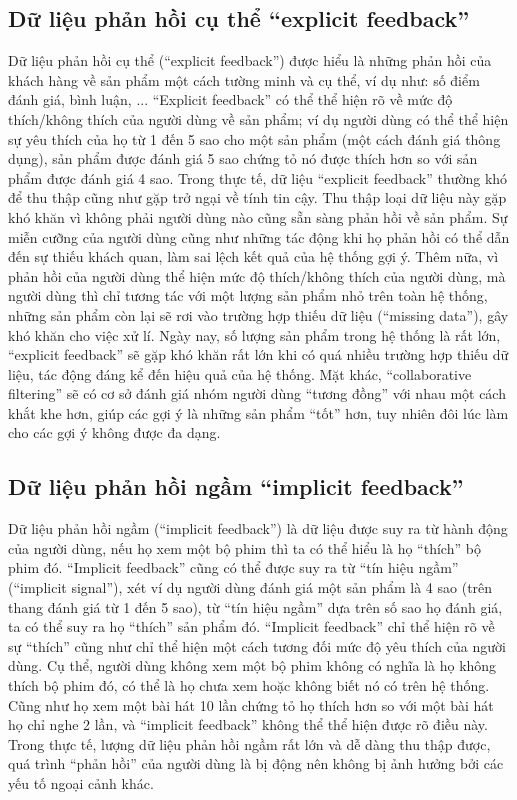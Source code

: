    \subsection{Dữ liệu phản hồi cụ thể ``explicit feedback''}
    Dữ liệu phản hồi cụ thể (``explicit feedback'') được hiểu là những
    phản hồi của khách hàng về sản phẩm một cách tường minh và cụ thể, ví dụ như: số điểm đánh giá,
    bình luận, ... ``Explicit feedback'' có thể thể hiện rõ về mức độ thích/không thích của người dùng về sản phẩm;
    ví dụ người dùng có thể thể hiện sự yêu thích của họ từ 1 đến 5 sao cho một sản phẩm (một cách đánh giá thông dụng), 
    sản phẩm được đánh giá 5 sao chứng tỏ nó được thích hơn so với sản phẩm được đánh giá 4 sao. 
    Trong thực tế, dữ liệu ``explicit feedback'' thường khó để thu thập cũng như gặp trở ngại về tính tin cậy.
    Thu thập loại dữ liệu này gặp khó khăn vì không phải người dùng nào cũng sẵn sàng phản hồi về sản phẩm. 
    Sự miễn cưỡng của người dùng cũng như những tác động khi họ phản hồi có thể dẫn đến sự thiếu khách quan,
    làm sai lệch kết quả của hệ thống gợi ý. 
    Thêm nữa, vì phản hồi của người dùng thể hiện mức độ thích/không thích của người dùng, mà người dùng thì chỉ tương tác với
    một lượng sản phẩm nhỏ trên toàn hệ thống, những sản phẩm còn lại sẽ rơi vào trường hợp thiếu dữ liệu (``missing data''),
    gây khó khăn cho việc xử lí. 
    Ngày nay, số lượng sản phẩm trong hệ thống là rất lớn, ``explicit feedback'' sẽ gặp khó khăn rất lớn khi có quá nhiều trường hợp thiếu dữ liệu,
    tác động đáng kể đến hiệu quả của hệ thống. Mặt khác, ``collaborative filtering'' sẽ có cơ sở đánh giá nhóm người dùng ``tương đồng'' với nhau
    một cách khắt khe hơn, giúp các gợi ý là những sản phẩm ``tốt'' hơn, tuy nhiên đôi lúc làm cho các gợi ý không được đa dạng.

    \subsection{Dữ liệu phản hồi ngầm ``implicit feedback''}
    Dữ liệu phản hồi ngầm (``implicit feedback'') là dữ liệu được suy ra từ hành động của người dùng, nếu họ xem một bộ phim
    thì ta có thể hiểu là họ ``thích'' bộ phim đó. ``Implicit feedback'' cũng có thể được suy ra từ ``tín hiệu ngầm'' (``implicit signal''),
    xét ví dụ người dùng đánh giá một sản phẩm là 4 sao (trên thang đánh giá từ 1 đến 5 sao), từ ``tín hiệu ngầm'' dựa trên số sao họ đánh giá,
    ta có thể suy ra họ ``thích'' sản phẩm đó. 
    ``Implicit feedback'' chỉ thể hiện rõ về sự ``thích'' cũng như chỉ thể hiện một cách tương đối mức độ yêu thích của người dùng.
    Cụ thể, người dùng không xem một bộ phim không có nghĩa là họ không thích bộ phim đó, có thể là họ chưa xem hoặc không biết nó có trên hệ thống.
    Cũng như họ xem một bài hát 10 lần chứng tỏ họ thích hơn so với một bài hát họ chỉ nghe 2 lần, 
    và ``implicit feedback'' không thể thể hiện được rõ điều này.
    Trong thực tế, lượng dữ liệu phản hồi ngầm rất lớn và dễ dàng thu thập được, quá trình ``phản hồi'' của người dùng là bị động
    nên không bị ảnh hưởng bởi các yếu tố ngoại cảnh khác. 


